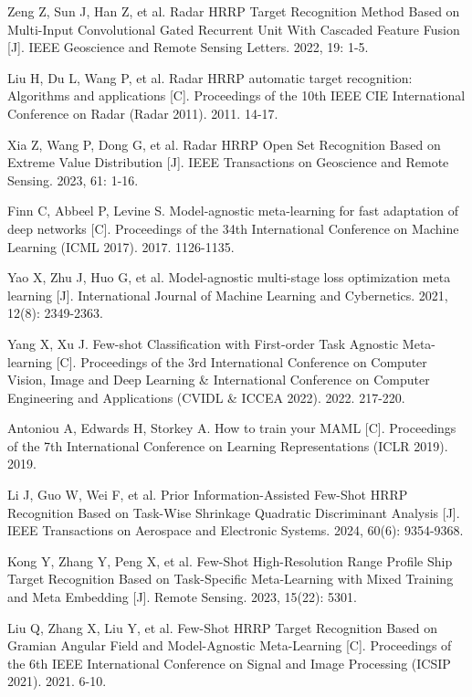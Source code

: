 \documentclass[doctor,twoside,ttf]{nudtpaper}
\begin{document}
\begin{thebibliography}{99}
 Zeng Z, Sun J, Han Z, et al. Radar HRRP Target Recognition Method Based on Multi-Input Convolutional Gated Recurrent Unit With Cascaded Feature Fusion [J]. IEEE Geoscience and Remote Sensing Letters. 2022, 19: 1-5.

 Liu H, Du L, Wang P, et al. Radar HRRP automatic target recognition: Algorithms and applications [C]. Proceedings of the 10th IEEE CIE International Conference on Radar (Radar 2011). 2011. 14-17.

 Xia Z, Wang P, Dong G, et al. Radar HRRP Open Set Recognition Based on Extreme Value Distribution [J]. IEEE Transactions on Geoscience and Remote Sensing. 2023, 61: 1-16.

 Finn C, Abbeel P, Levine S. Model-agnostic meta-learning for fast adaptation of deep networks [C]. Proceedings of the 34th International Conference on Machine Learning (ICML 2017). 2017. 1126-1135.

 Yao X, Zhu J, Huo G, et al. Model-agnostic multi-stage loss optimization meta learning [J]. International Journal of Machine Learning and Cybernetics. 2021, 12(8): 2349-2363.

 Yang X, Xu J. Few-shot Classification with First-order Task Agnostic Meta-learning [C]. Proceedings of the 3rd International Conference on Computer Vision, Image and Deep Learning \& International Conference on Computer Engineering and Applications (CVIDL \& ICCEA 2022). 2022. 217-220.

 Antoniou A, Edwards H, Storkey A. How to train your MAML [C]. Proceedings of the 7th International Conference on Learning Representations (ICLR 2019). 2019.

 Li J, Guo W, Wei F, et al. Prior Information-Assisted Few-Shot HRRP Recognition Based on Task-Wise Shrinkage Quadratic Discriminant Analysis [J]. IEEE Transactions on Aerospace and Electronic Systems. 2024, 60(6): 9354-9368.

 Kong Y, Zhang Y, Peng X, et al. Few-Shot High-Resolution Range Profile Ship Target Recognition Based on Task-Specific Meta-Learning with Mixed Training and Meta Embedding [J]. Remote Sensing. 2023, 15(22): 5301.

 Liu Q, Zhang X, Liu Y, et al. Few-Shot HRRP Target Recognition Based on Gramian Angular Field and Model-Agnostic Meta-Learning [C]. Proceedings of the 6th IEEE International Conference on Signal and Image Processing (ICSIP 2021). 2021. 6-10.


\end{thebibliography}
\end{document}
